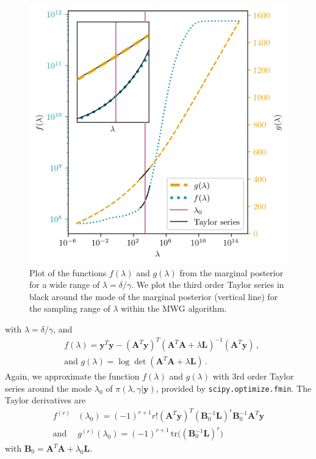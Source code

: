 \begin{figure}[ht!]
	\centering
	\includegraphics{f_and_g_phd.png}
	\caption[Plot of the functions $f(\lambda)$ and $g(\lambda)$ for marginal posterior.]{Plot of the functions $f(\lambda)$ and $g(\lambda)$ from the marginal posterior for a wide range of $\lambda = \delta / \gamma$. We plot the third order Taylor series in black around the mode of the marginal posterior (vertical line) for the sampling range of $\lambda$ within the MWG algorithm.}
	\label{fig:fandg}
\end{figure}
with $\lambda = \delta / \gamma$, and
\begin{subequations}
	\label{eq:Updfandg}
	\begin{align}
		&f ( \lambda) = \bm{y}^T \bm{y} - (\bm{A}^T \bm{y})^T (\bm{A}^T  \bm{A} + \lambda \bm{L})^{-1} (\bm{A}^T \bm{y})  \, ,  \\
		&\text{and } g(\lambda) = \log \det (\bm{A}^T  \bm{A} + \lambda \bm{L}) \, .
	\end{align}
\end{subequations}
Again, we approximate the function $f(\lambda)$ and $g(\lambda)$ with 3rd order Taylor series around the mode $\lambda_0$ of $\pi(\lambda, \gamma | \bm{y})$, provided by \texttt{scipy.optimize.fmin}.
The Taylor derivatives are
\begin{align}
	f^{(r)}& (\lambda_0)= (-1)^{r+1} r! (\bm{A}^T \bm{y})^T (\bm{B}_0^{-1} \bm{L})^r \bm{B}_0^{-1} \bm{A}^T \bm{y} \label{eq:Updftay}  \\
	\text{and } &g^{(r)} ( \lambda_0) = (-1)^{r+1} \, \text{tr} \big( (\bm{B}_0^{-1}\bm{L})^r \big)
	\label{eq:Updgtay}
\end{align} 
with $\bm{B}_0 = \bm{A}^T  \bm{A} + \lambda_0 \bm{L}$.

